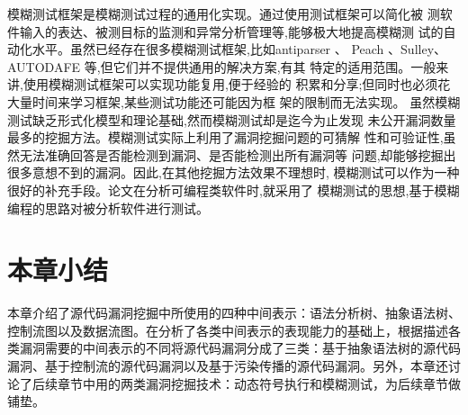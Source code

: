 模糊测试框架是模糊测试过程的通用化实现。通过使用测试框架可以简化被
测软件输入的表达、被测目标的监测和异常分析管理等,能够极大地提高模糊测
试的自动化水平。虽然已经存在很多模糊测试框架,比如antiparser 、
Peach 、Sulley、AUTODAFE 等,但它们并不提供通用的解决方案,有其
特定的适用范围。一般来讲,使用模糊测试框架可以实现功能复用,便于经验的
积累和分享;但同时也必须花大量时间来学习框架,某些测试功能还可能因为框
架的限制而无法实现。
虽然模糊测试缺乏形式化模型和理论基础,然而模糊测试却是迄今为止发现
未公开漏洞数量最多的挖掘方法。模糊测试实际上利用了漏洞挖掘问题的可猜解
性和可验证性,虽然无法准确回答是否能检测到漏洞、是否能检测出所有漏洞等
问题,却能够挖掘出很多意想不到的漏洞。因此,在其他挖掘方法效果不理想时,
模糊测试可以作为一种很好的补充手段。论文在分析可编程类软件时,就采用了
模糊测试的思想,基于模糊编程的思路对被分析软件进行测试。




\section{本章小结}

本章介绍了源代码漏洞挖掘中所使用的四种中间表示：语法分析树、抽象语法树、控制流图以及数据流图。在分析了各类中间表示的表现能力的基础上，根据描述各类漏洞需要的中间表示的不同将源代码漏洞分成了三类：基于抽象语法树的源代码漏洞、基于控制流的源代码漏洞以及基于污染传播的源代码漏洞。另外，本章还讨论了后续章节中用的两类漏洞挖掘技术：动态符号执行和模糊测试，为后续章节做铺垫。
